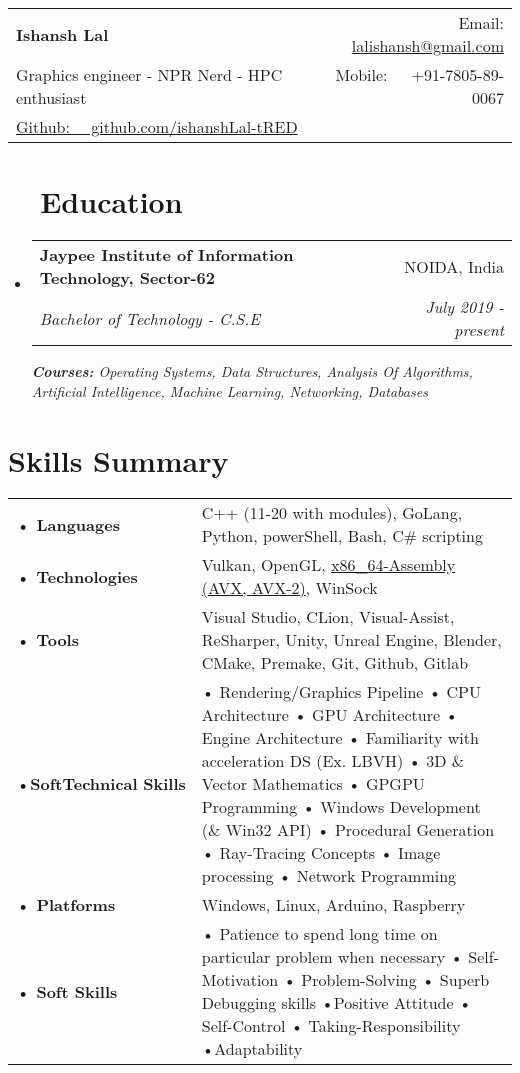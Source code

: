 \documentclass[a4paper,20pt]{article}
\makeatletter
\newcommand{\resumeSubheading}[4]{
  \vspace{-1pt}\item
    \begin{tabular*}{0.97\textwidth}{l@{\extracolsep{\fill}}r}
      \textbf{#1} & #2 \\
      \textit{#3} & \textit{#4} \\
    \end{tabular*}\vspace{-5pt}
}
\newcommand{\resumeSubHeadingListStart}{\begin{itemize}[leftmargin=*]}
\newcommand{\resumeSubHeadingListEnd}{\end{itemize}}
\makeatother
\begin{document}
\begin{tabular*}{\textwidth}{l@{\extracolsep{\fill}}r}
  \textbf{{\LARGE Ishansh Lal}} & Email: \href{mailto:}{lalishansh@gmail.com}\\
  Graphics engineer - NPR Nerd - HPC enthusiast & Mobile:~~~+91-7805-89-0067 \\
  \href{https://github.com/ishanshLal-tRED}{Github: ~~github.com/ishanshLal-tRED} \\
\end{tabular*}

\section{~~Education}
  \resumeSubHeadingListStart
    \resumeSubheading
      {Jaypee Institute of Information Technology, Sector-62}{NOIDA, India}
      {Bachelor of Technology - C.S.E}{July 2019 - present}
      {\scriptsize \textit{ \footnotesize{\newline{}\textbf{Courses:} Operating Systems, Data Structures, Analysis Of Algorithms, Artificial Intelligence, Machine Learning, Networking, Databases}}}\\
    \resumeSubHeadingListEnd
\vspace{-6pt}
\section{Skills Summary}
\begin{tabular}{p{}p{}}
    \textbf{• Languages}&{C++ (11-20 with modules), GoLang, Python, powerShell, Bash, C\# scripting}\\
    \textbf{• Technologies}&{Vulkan, OpenGL, \url{x86_64-Assembly (AVX, AVX-2)}, WinSock}\\
    \textbf{• Tools}&{Visual Studio, CLion, Visual-Assist, ReSharper, Unity, Unreal Engine, Blender, CMake, Premake, Git, Github, Gitlab}\\
    \textbf{•\hspace{5pt}SoftTechnical\hspace{15pt}\textcolor{white}{!}\hspace{7pt}Skills}&{• Rendering/Graphics Pipeline • CPU Architecture • GPU Architecture • Engine Architecture • Familiarity with acceleration DS (Ex. LBVH) • 3D \& Vector Mathematics • GPGPU Programming • Windows Development (\& Win32 API) • Procedural Generation • Ray-Tracing Concepts • Image processing • Network Programming}\\
    \textbf{• Platforms}&{Windows, Linux, Arduino, Raspberry}\\
    \textbf{• Soft Skills}&{• Patience to spend long time on particular problem when necessary • Self-Motivation • Problem-Solving • Superb Debugging skills •Positive Attitude • Self-Control • Taking-Responsibility •Adaptability}
\end{tabular}
\vspace{-2pt}
\end{document}
